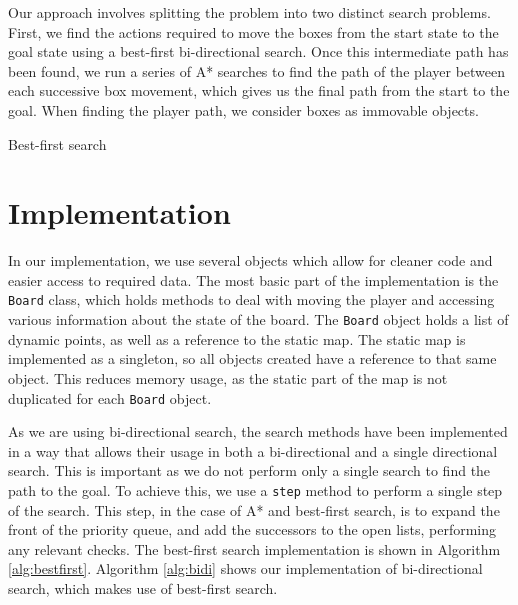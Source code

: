 \documentclass[a4paper,11pt]{article}
\begin{document}
Our approach involves splitting the problem into two distinct search
problems. First, we find the actions required to move the boxes from the start
state to the goal state using a best-first bi-directional search. Once this
intermediate path has been found, we run a series of A* searches to find the
path of the player between each successive box movement, which gives us the
final path from the start to the goal. When finding the player path, we consider
boxes as immovable objects.

\begin{algorithm}
  \DontPrintSemicolon
\caption{Best-first search}
\label{alg:bestfirst}
\end{algorithm}

\section{Implementation}
In our implementation, we use several objects which allow for cleaner code and
easier access to required data. The most basic part of the implementation is the
\texttt{Board} class, which holds methods to deal with moving the player and
accessing various information about the state of the board. The \texttt{Board}
object holds a list of dynamic points, as well as a reference to the static
map. The static map is implemented as a singleton, so all objects created have a
reference to that same object. This reduces memory usage, as the static part of
the map is not duplicated for each \texttt{Board} object.

As we are using bi-directional search, the search methods have been implemented
in a way that allows their usage in both a bi-directional and a single
directional search. This is important as we do not perform only a single search
to find the path to the goal. To achieve this, we use a \texttt{step} method to
perform a single step of the search. This step, in the case of A* and best-first
search, is to expand the front of the priority queue, and add the successors to
the open lists, performing any relevant checks. The best-first search
implementation is shown in Algorithm \ref{alg:bestfirst}. Algorithm
\ref{alg:bidi} shows our implementation of bi-directional search, which makes
use of best-first search.
\end{document}
